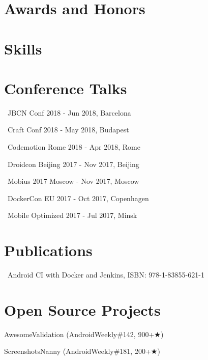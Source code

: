\documentclass{cv}
\begin{document}



\section*{Awards and Honors}



\section*{Skills}



\section*{Conference Talks}

\faMicrophone\ JBCN Conf 2018 - Jun 2018, Barcelona

\faMicrophone\ Craft Conf 2018 - May 2018, Budapest

\faMicrophone\ Codemotion Rome 2018 - Apr 2018, Rome

\faMicrophone\ Droidcon Beijing 2017 - Nov 2017, Beijing

\faMicrophone\ Mobius 2017 Moscow - Nov 2017, Moscow

\faMicrophone\ DockerCon EU 2017 - Oct 2017, Copenhagen

\faMicrophone\ Mobile Optimized 2017 - Jul 2017, Minsk
~\\

\section*{Publications}

\faBook\ Android CI with Docker and Jenkins, ISBN: 978-1-83855-621-1
~\\

\section*{Open Source Projects}

AwesomeValidation (AndroidWeekly\#142, 900+{\DejaVuSans ★})

ScreenshotsNanny (AndroidWeekly\#181, 200+{\DejaVuSans ★})
\end{document}
